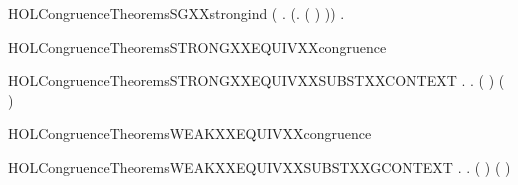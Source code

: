 \begin{SaveVerbatim}{HOLCongruenceTheoremsSGXXstrongind}
       (\HOLSymConst{\HOLTokenForall{}} .   \HOLSymConst{\HOLTokenConj{}}   \HOLSymConst{\HOLTokenImp{}}  (\HOLTokenLambda{}.  ( ) )) \HOLSymConst{\HOLTokenImp{}}
       \HOLSymConst{\HOLTokenForall{}}.   \HOLSymConst{\HOLTokenImp{}}  
\end{SaveVerbatim}
\newcommand{\HOLCongruenceTheoremsSGXXstrongind}{\UseVerbatim{HOLCongruenceTheoremsSGXXstrongind}}
\begin{SaveVerbatim}{HOLCongruenceTheoremsSTRONGXXEQUIVXXcongruence}
\HOLTokenTurnstile{}  
\end{SaveVerbatim}
\newcommand{\HOLCongruenceTheoremsSTRONGXXEQUIVXXcongruence}{\UseVerbatim{HOLCongruenceTheoremsSTRONGXXEQUIVXXcongruence}}
\begin{SaveVerbatim}{HOLCongruenceTheoremsSTRONGXXEQUIVXXSUBSTXXCONTEXT}
\HOLTokenTurnstile{} \HOLSymConst{\HOLTokenForall{}} .
          \HOLSymConst{\HOLTokenImp{}}
       \HOLSymConst{\HOLTokenForall{}}.   \HOLSymConst{\HOLTokenImp{}}  ( ) ( )
\end{SaveVerbatim}
\newcommand{\HOLCongruenceTheoremsSTRONGXXEQUIVXXSUBSTXXCONTEXT}{\UseVerbatim{HOLCongruenceTheoremsSTRONGXXEQUIVXXSUBSTXXCONTEXT}}
\begin{SaveVerbatim}{HOLCongruenceTheoremsWEAKXXEQUIVXXcongruence}
\HOLTokenTurnstile{}  
\end{SaveVerbatim}
\newcommand{\HOLCongruenceTheoremsWEAKXXEQUIVXXcongruence}{\UseVerbatim{HOLCongruenceTheoremsWEAKXXEQUIVXXcongruence}}
\begin{SaveVerbatim}{HOLCongruenceTheoremsWEAKXXEQUIVXXSUBSTXXGCONTEXT}
\HOLTokenTurnstile{} \HOLSymConst{\HOLTokenForall{}} .
          \HOLSymConst{\HOLTokenImp{}} \HOLSymConst{\HOLTokenForall{}}.   \HOLSymConst{\HOLTokenImp{}}  ( ) ( )
\end{SaveVerbatim}
